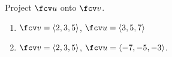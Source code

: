 Project $\fcv u$ onto $\fcv v$.

\begin{enumerate}
\item $\fcv v=\langle 2,3,5 \rangle$, $\fcv u=\langle 3,5,7 \rangle$
\item $\fcv v=\langle 2,3,5 \rangle$, $\fcv u=\langle -7,-5,-3 \rangle$.
\end{enumerate}